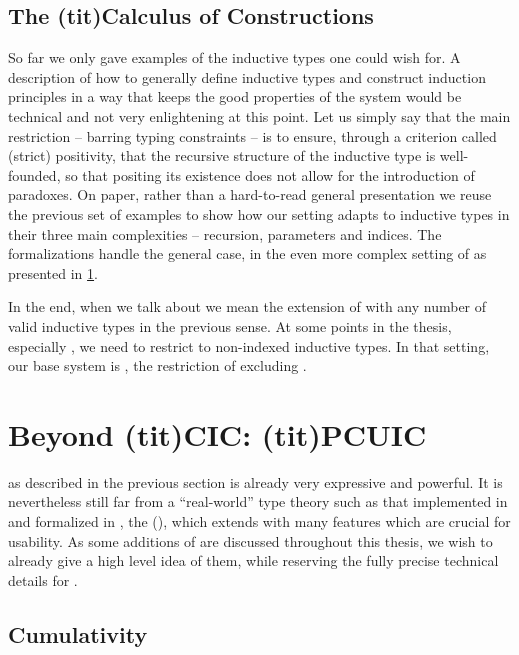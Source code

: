 \subsection{The \kl(tit){Calculus of Constructions}}

So far we only gave examples of the inductive types one could wish for.
A description of how to generally define inductive types and construct induction principles
in a way that keeps the good properties of the system would be technical and not
very enlightening at this point. Let us simply say that the main restriction – barring typing
constraints – is to ensure, through a criterion called (strict) positivity,
that the recursive structure of the inductive type
is well-founded, so that positing its existence does not allow for the
introduction of paradoxes.
On paper, rather than a hard-to-read general presentation we reuse the previous
set of examples to show how our setting adapts to inductive types in their
three main complexities – recursion, parameters and indices.
The formalizations handle the general case, in the even more complex setting of 
as presented in \cref{sec:tech-pcuic}.

In the end, when we talk about  we mean the extension of  with any number of
valid inductive types in the previous sense.
At some points in the thesis, especially , we need to restrict to
non-indexed inductive types. In that setting, our base system is ,
the restriction of  excluding .



\section{Beyond \kl(tit){CIC}: \kl(tit){PCUIC}}
\label{sec:tech-pcuic}

 as described in the previous section is already very expressive and powerful.
It is nevertheless
still far from a “real-world” type theory such as that implemented in  and
formalized in , the  (),
which extends  with many features which are crucial for usability. 
As some additions of  are discussed throughout this
thesis, we wish to already give a high level idea of them,
while reserving the fully precise technical details for .

\subsection{Cumulativity}

